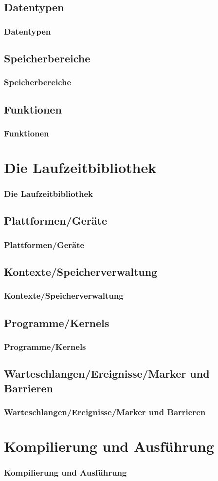 \documentclass{beamer}
\begin{document}
\subsection{Datentypen}
\begin{frame}[fragile]
\frametitle{Datentypen}
\end{frame}
\subsection{Speicherbereiche}
\begin{frame}[fragile]
\frametitle{Speicherbereiche}
\end{frame}
\subsection{Funktionen}
\begin{frame}[fragile]
\frametitle{Funktionen}
\end{frame}

\section{Die Laufzeitbibliothek}
\begin{frame}[fragile]
\frametitle{Die Laufzeitbibliothek}
\end{frame}
\subsection{Plattformen/Geräte}
\begin{frame}[fragile]
\frametitle{Plattformen/Geräte}
\end{frame}
\subsection{Kontexte/Speicherverwaltung}
\begin{frame}[fragile]
\frametitle{Kontexte/Speicherverwaltung}
\end{frame}
\subsection{Programme/Kernels}
\begin{frame}[fragile]
\frametitle{Programme/Kernels}
\end{frame}
\subsection{Warteschlangen/Ereignisse/Marker und Barrieren}
\begin{frame}[fragile]
\frametitle{Warteschlangen/Ereignisse/Marker und Barrieren}
\end{frame}

\section{Kompilierung und Ausführung}
\begin{frame}[fragile]
\frametitle{Kompilierung und Ausführung}
\end{frame}
\end{document}
